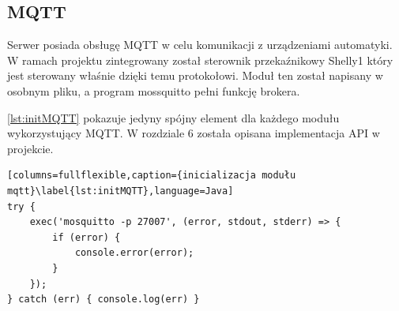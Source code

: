 \subsection{MQTT}
Serwer posiada obsługę MQTT w celu komunikacji z urządzeniami automatyki. W ramach projektu zintegrowany został sterownik przekaźnikowy Shelly1 który jest sterowany właśnie dzięki temu protokołowi. Moduł ten został napisany w osobnym pliku, a program mossquitto pełni funkcję brokera.
\par \ref{lst:initMQTT} pokazuje jedyny spójny element dla każdego modułu wykorzystujący MQTT. W rozdziale 6 została opisana implementacja API w projekcie.

\begin{lstlisting}[columns=fullflexible,caption={inicializacja modułu mqtt}\label{lst:initMQTT},language=Java]
try {
	exec('mosquitto -p 27007', (error, stdout, stderr) => {
		if (error) {
			console.error(error);
		}
	});
} catch (err) { console.log(err) }
\end{lstlisting}
